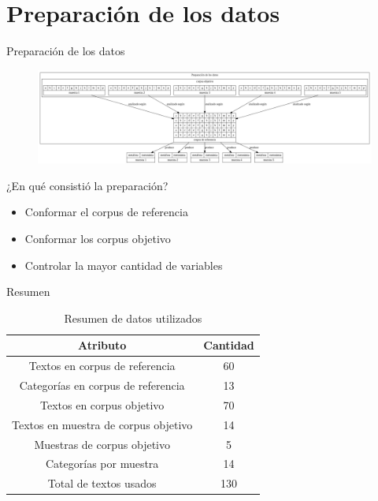 \documentclass[presentation]{beamer}
\begin{document}
\section{Preparación de los datos}
\label{sec:org9c90d98}
\begin{frame}[label={sec:org0b38195}]{Preparación de los datos}
\begin{figure}
\includegraphics[width=\textwidth]{./assets/preparacion_visualizacion.png}
\end{figure}

\begin{block}{¿En qué consistió la preparación?}
\begin{itemize}
\item Conformar el corpus de referencia
\item Conformar los corpus objetivo
\item Controlar la mayor cantidad de variables
\end{itemize}
\end{block}
\end{frame}
\begin{frame}[label={sec:org28ff059}]{Resumen}
     \begin{table}[!ht]
    \centering

    \begin{tabular}{|c|c|}
    \hline
      Atributo & Cantidad \\ \hline
      Textos en corpus de referencia & 60 \\ \hline
      Categorías en corpus de referencia  & 13 \\ \hline
     Textos en corpus objetivo & 70 \\ \hline
     Textos en muestra de corpus objetivo & 14 \\ \hline
     Muestras de corpus objetivo & 5 \\ \hline
     Categorías por muestra & 14  \\ \hline
     Total de textos usados & 130  \\ \hline
    \end{tabular}
\caption{Resumen de datos utilizados}
\label{tab:resumen_preparacion}
\end{table}
\end{frame}
\end{document}

